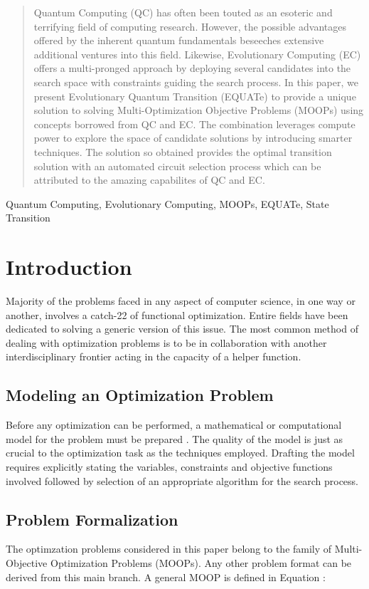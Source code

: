 \documentclass[conference]{IEEEtran}
\begin{document}
\begin{abstract}
Quantum Computing (QC) has often been touted as an esoteric and terrifying field of computing research. However, the possible advantages offered by the inherent quantum fundamentals beseeches extensive additional ventures into this field. Likewise, Evolutionary Computing (EC) offers a multi-pronged approach by deploying several candidates into the search space with constraints guiding the search process. In this paper, we present Evolutionary Quantum Transition (EQUATe) to provide a unique solution to solving Multi-Optimization Objective Problems (MOOPs) using concepts borrowed from QC and EC. The combination leverages compute power to explore the space of candidate solutions by introducing smarter techniques. The solution so obtained provides the optimal transition solution with an automated circuit selection process which can be attributed to the amazing capabilites of QC and EC. 
\end{abstract}

\begin{IEEEkeywords}
Quantum Computing, Evolutionary Computing, MOOPs, EQUATe, State Transition
\end{IEEEkeywords}

\section{Introduction}

Majority of the problems faced in any aspect of computer science, in one way or another, involves a catch-22 of functional optimization. Entire fields have been dedicated to solving a generic version of this issue. The most common method of dealing with optimization problems is to be in collaboration with another interdisciplinary frontier acting in the capacity of a helper function. 

\subsection{Modeling an Optimization Problem}
Before any optimization can be performed, a mathematical or computational model for the problem must be prepared \cite{hara}. The quality of the model is just as crucial to the optimization task as the techniques employed. Drafting the model requires explicitly stating the variables, constraints and objective functions involved followed by selection of an appropriate algorithm for the search process. 

\subsection{Problem Formalization}
The optimzation problems considered in this paper belong to the family of Multi-Objective Optimization Problems (MOOPs)\cite{mul}. Any other problem format can be derived from this main branch. A general MOOP is defined in Equation :
\end{document}
